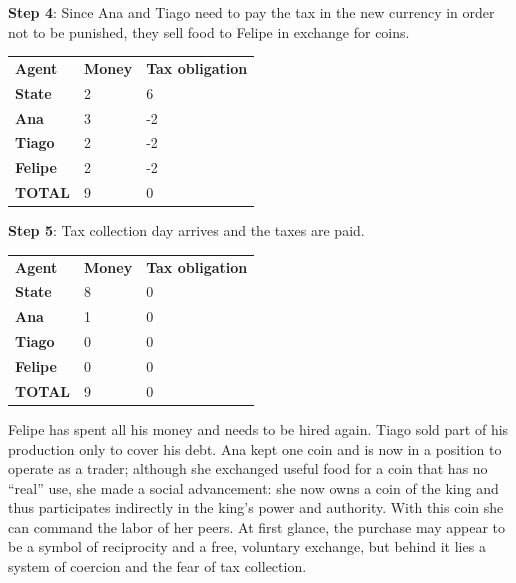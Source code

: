 \textbf{Step 4}: Since Ana and Tiago need to pay the tax in the new currency in order not to be punished, they sell food to Felipe in exchange for coins.

\begin{table}
\centering

\begin{tabular}{l l l}
\textbf{Agent} & \textbf{Money} & \textbf{Tax obligation} \\

\textbf{State} & 2 & 6 \\
\textbf{Ana} & 3 & -2 \\
\textbf{Tiago} & 2 & -2 \\
\textbf{Felipe} & 2 & -2 \\
\textbf{TOTAL} & 9 & 0 \\

\end{tabular}

\end{table}

\textbf{Step 5}: Tax collection day arrives and the taxes are paid.

\begin{table}
\centering

\begin{tabular}{l l l}
\textbf{Agent} & \textbf{Money} & \textbf{Tax obligation} \\

\textbf{State} & 8 & 0 \\
\textbf{Ana} & 1 & 0 \\
\textbf{Tiago} & 0 & 0 \\
\textbf{Felipe} & 0 & 0 \\
\textbf{TOTAL} & 9 & 0 \\

\end{tabular}

\end{table}

Felipe has spent all his money and needs to be hired again. Tiago sold part of his production only to cover his debt. Ana kept one coin and is now in a position to operate as a trader; although she exchanged useful food for a coin that has no “real” use, she made a social advancement: she now owns a coin of the king and thus participates indirectly in the king’s power and authority. With this coin she can command the labor of her peers. At first glance, the purchase may appear to be a symbol of reciprocity and a free, voluntary exchange, but behind it lies a system of coercion and the fear of tax collection.

